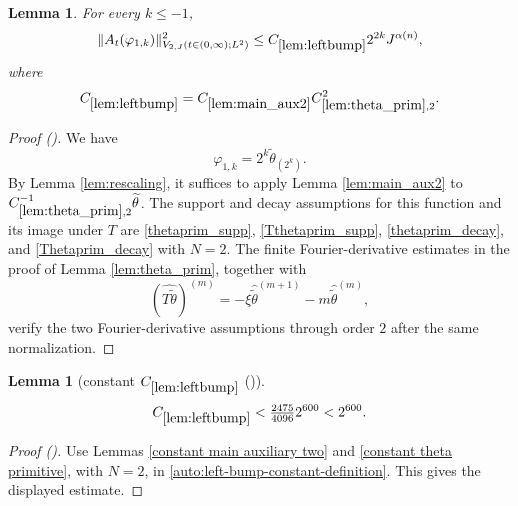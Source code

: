 \documentclass[12pt,reqno]{amsart}
\newcommand{\auto}{{({\tiny\faCar})}}
\theoremstyle{plain}
\newtheorem{lemma}[theorem]{Lemma}
\numberwithin{equation}{section}
\theoremstyle{remark}
\newcommand{\using}[1]{}
\begin{document}
\begin{lemma}\label{lem:leftbump}\using{lem:rescaling}\using{lem:main_aux2}\using{lem:theta_prim}
For every $k\le-1$,
\begin{equation}\label{leftbump}
\|A_t(\varphi_{1,k})\|_{V_{2,J}(t\in(0,\infty);L^2)}^2
\le C_{\ref{lem:leftbump}}2^{2k}J^{\alpha(n)},
\end{equation}
where
\begin{equation}\label{auto:left-bump-constant-definition}
C_{\ref{lem:leftbump}}
=C_{\ref{lem:main_aux2}}C_{\ref{lem:theta_prim},2}^2.
\end{equation}
\end{lemma}

\begin{proof}[Proof \auto]
We have
\[
\varphi_{1,k}=2^k\widetilde\theta_{(2^k)}.
\]
By Lemma \ref{lem:rescaling}, it suffices to apply Lemma \ref{lem:main_aux2} to $C_{\ref{lem:theta_prim},2}^{-1}\widetilde\theta$. The support and decay assumptions for this function and its image under $T$ are \eqref{thetaprim_supp}, \eqref{Tthetaprim_supp}, \eqref{thetaprim_decay}, and \eqref{Thetaprim_decay} with $N=2$. The finite Fourier-derivative estimates in the proof of Lemma \ref{lem:theta_prim}, together with
\[
(\widehat{T\widetilde\theta})^{(m)}
=-\xi\widehat{\widetilde\theta}^{(m+1)}
-m\widehat{\widetilde\theta}^{(m)},
\]
verify the two Fourier-derivative assumptions through order $2$ after the same normalization.
\end{proof}

\begin{lemma}[constant $C_{\ref{lem:leftbump}}$ \auto]\label{constant left bump}\using{constant main auxiliary two}\using{constant theta primitive}\using{lem:leftbump}
\begin{equation}\label{constant left bump bound}
C_{\ref{lem:leftbump}}<\tfrac{2475}{4096}2^{600}<2^{600}.
\end{equation}
\end{lemma}
\begin{proof}[Proof \auto]
Use Lemmas \ref{constant main auxiliary two} and \ref{constant theta primitive}, with $N=2$, in \eqref{auto:left-bump-constant-definition}. This gives the displayed estimate.
\end{proof}
\end{document}
